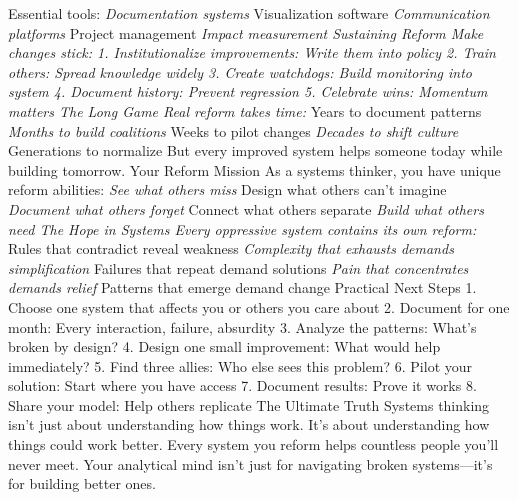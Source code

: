 \documentclass[12pt]{book}
\begin{document}
Essential tools:
\textit{ Documentation systems
} Visualization software
\textit{ Communication platforms
} Project management
\textit{ Impact measurement
Sustaining Reform
Make changes stick:
1. Institutionalize improvements: Write them into policy
2. Train others: Spread knowledge widely
3. Create watchdogs: Build monitoring into system
4. Document history: Prevent regression
5. Celebrate wins: Momentum matters
The Long Game
Real reform takes time:
} Years to document patterns
\textit{ Months to build coalitions
} Weeks to pilot changes
\textit{ Decades to shift culture
} Generations to normalize
But every improved system helps someone today while building tomorrow.
Your Reform Mission
As a systems thinker, you have unique reform abilities:
\textit{ See what others miss
} Design what others can't imagine
\textit{ Document what others forget
} Connect what others separate
\textit{ Build what others need
The Hope in Systems
Every oppressive system contains its own reform:
} Rules that contradict reveal weakness
\textit{ Complexity that exhausts demands simplification
} Failures that repeat demand solutions
\textit{ Pain that concentrates demands relief
} Patterns that emerge demand change
Practical Next Steps
1. Choose one system that affects you or others you care about
2. Document for one month: Every interaction, failure, absurdity
3. Analyze the patterns: What's broken by design?
4. Design one small improvement: What would help immediately?
5. Find three allies: Who else sees this problem?
6. Pilot your solution: Start where you have access
7. Document results: Prove it works
8. Share your model: Help others replicate
The Ultimate Truth
Systems thinking isn't just about understanding how things work. It's about understanding how things could work better. Every system you reform helps countless people you'll never meet.
Your analytical mind isn't just for navigating broken systems—it's for building better ones.
\end{document}
